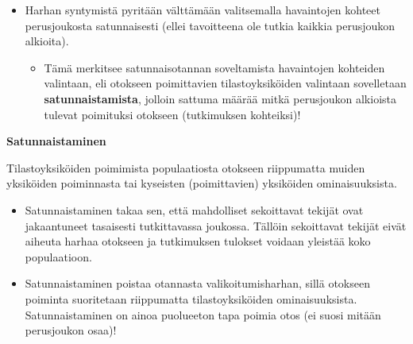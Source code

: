 \documentclass[
]{book}
\providecommand{\tightlist}{%
  \setlength{\itemsep}{0pt}\setlength{\parskip}{0pt}}
\begin{document}
\begin{itemize}
\tightlist
\item
  Harhan syntymistä pyritään välttämään valitsemalla havaintojen kohteet perusjoukosta satunnaisesti (ellei tavoitteena ole tutkia kaikkia perusjoukon alkioita).

  \begin{itemize}
  \tightlist
  \item
    Tämä merkitsee satunnaisotannan soveltamista havaintojen kohteiden valintaan, eli otokseen poimittavien tilastoyksiköiden valintaan sovelletaan \textbf{satunnaistamista}, jolloin sattuma määrää mitkä perusjoukon alkioista tulevat poimituksi otokseen (tutkimuksen kohteiksi)!
  \end{itemize}
\end{itemize}

\begin{defblock}{}

\textbf{Satunnaistaminen}

Tilastoyksiköiden poimimista populaatiosta otokseen riippumatta muiden yksiköiden poiminnasta tai kyseisten (poimittavien) yksiköiden ominaisuuksista.

\begin{itemize}
\item
  Satunnaistaminen takaa sen, että mahdolliset sekoittavat tekijät ovat jakaantuneet tasaisesti tutkittavassa joukossa. Tällöin sekoittavat tekijät eivät aiheuta harhaa otokseen ja tutkimuksen tulokset voidaan yleistää koko populaatioon.
\item
  Satunnaistaminen poistaa otannasta valikoitumisharhan, sillä otokseen poiminta suoritetaan riippumatta tilastoyksiköiden ominaisuuksista. Satunnaistaminen on ainoa puolueeton tapa poimia otos (ei suosi mitään perusjoukon osaa)!
\end{itemize}

\end{defblock}
\end{document}
